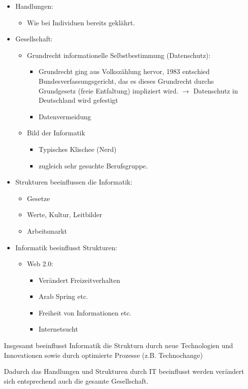 \begin{itemize}
\item Handlungen: 
	\begin{itemize}
		\item Wie bei Individuen bereits geklährt.
	\end{itemize}
\item Gesellschaft:
	\begin{itemize}
		\item Grundrecht informationelle Selbstbestimmung (Datenschutz):
			\begin{itemize}
				\item Grundrecht ging aus Volkszählung hervor, 1983 entschied Bundesverfassungsgericht, das es dieses Grundrecht durchs Grundgesetz (freie Entfaltung) impliziert wird.
				$ \rightarrow $ Datenschutz in Deutschland wird gefestigt 
				\item Datenvermeidung %
			\end{itemize}
		\item Bild der Informatik
			\begin{itemize}
				\item Typisches Klischee (Nerd)
				\item zugleich sehr gesuchte Berufsgruppe.
			\end{itemize}
	\end{itemize}

\item Strukturen beeinflussen die Informatik:
	\begin{itemize}
		\item Gesetze
		\item Werte, Kultur, Leitbilder 
		\item Arbeitsmarkt
	\end{itemize}
\item Informatik beeinflusst Strukturen:
		\begin{itemize}
		\item Web 2.0:
			\begin{itemize}
			\item Verändert Freizeitverhalten
			\item Arab Spring etc.
			\item Freiheit von Informationen etc.
			\item Internetsucht
			\end{itemize}
		\end{itemize}
\end{itemize}

Insgesamt beeinflusst Informatik die Strukturn durch neue Technologien und Innovationen sowie durch optimierte Prozesse (z.B. Technochange)

Dadurch das Handlungen und Strukturen durch IT beeinflusst werden verändert sich entsprechend auch die gesamte Gesellschaft.